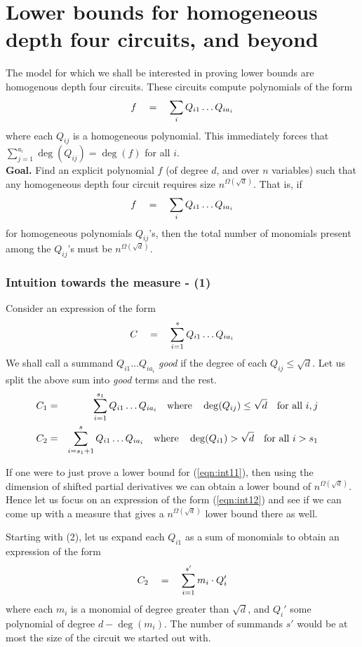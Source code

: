 \chapter{Lower bounds for homogeneous depth four circuits, and beyond}

The model for which we shall be interested in proving lower bounds are homogenous depth four circuits. These circuits compute polynomials of the form
\[
f \quad = \quad \sum_{i} Q_{i1}\dots Q_{ia_i}
\]
where each $Q_{ij}$ is a homogeneous polynomial. This immediately forces that $\sum_{j=1}^{a_i} \deg(Q_{ij}) = \deg(f)$ for all $i$. \\

{\bf Goal. } Find an explicit polynomial $f$ (of degree $d$, and over $n$ variables) such that any homogeneous depth four circuit requires size $n^{\Omega(\sqrt{d})}$. That is, if
\[
f \quad = \quad \sum_{i} Q_{i1}\dots Q_{ia_i}
\]
for homogeneous polynomials $Q_{ij}$'s, then the total number of monomials present among the $Q_{ij}$'s must be $n^{\Omega(\sqrt{d})}$. 

\subsection*{Intuition towards the measure - (1)}

Consider an expression of the form
\[
C \quad = \quad \sum_{i=1}^s Q_{i1}\dots Q_{ia_i}
\]
We shall call a summand $Q_{i1}\dots Q_{ia_i}$ \emph{good} if the degree of each $Q_{ij} \leq \sqrt{d}$. Let us split the above sum into \emph{good} terms and the rest. 
\begin{eqnarray}
C_1 &=& \sum_{i=1}^{s_1} Q_{i1}\dots Q_{ia_i} \quad \text{where} \quad \deg(Q_{ij}) \leq \sqrt{d} \quad \text{for all $i,j$} \quad\label{eqn:int11}\\
C_2 &=& \sum_{i=s_1+1}^{s} Q_{i1}\dots Q_{ia_i} \quad \text{where} \quad \deg(Q_{i1}) > \sqrt{d} \quad \text{for all $i > s_1$} \quad\label{eqn:int12}
\end{eqnarray}

If one were to just prove a lower bound for (\ref{eqn:int11}), then using the dimension of shifted partial derivatives we can obtain a lower bound of $n^{\Omega(\sqrt{d})}$. Hence let us focus on an expression of the form (\ref{eqn:int12}) and see if we can come up with a measure that gives a $n^{\Omega(\sqrt{d})}$ lower bound there as well. 

Starting with (2), let us expand each $Q_{i1}$ as a sum of monomials to obtain an expression of the form
\[
C_2 \quad = \quad \sum_{i=1}^{s'} m_i\cdot  Q_i'
\]
where each $m_i$ is a monomial of degree greater than $\sqrt{d}$, and $Q_i'$ some polynomial of degree $d - \deg(m_i)$. The number of summands $s'$ would be at most the size of the circuit we started out with.\\

